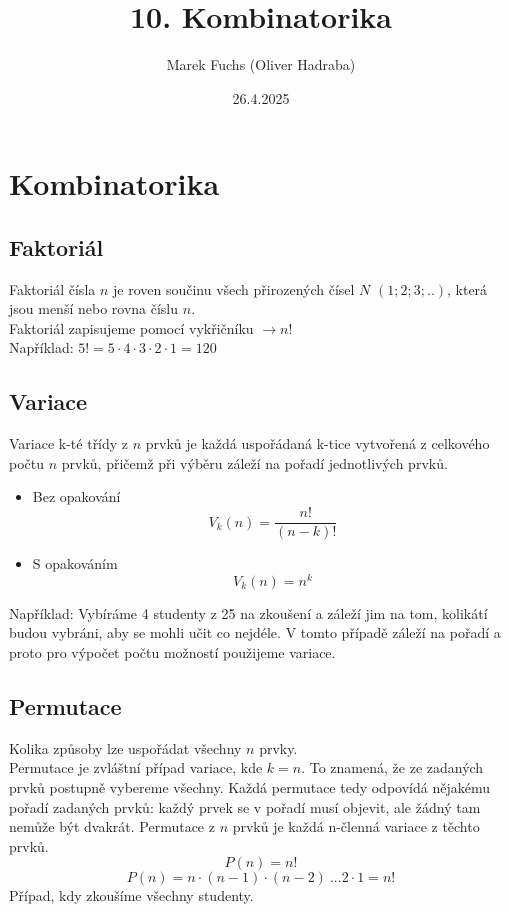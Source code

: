 \title{ 10. Kombinatorika}
\author{Marek Fuchs (Oliver Hadraba)}
\date{26.4.2025}

\maketitle



\section{Kombinatorika}
    
     \subsection{Faktoriál}
     Faktoriál čísla $n$ je roven součinu všech přirozených čísel $N$ $(1;2;3;..)$, která jsou menší nebo rovna číslu $n$.\\
     Faktoriál zapisujeme pomocí vykřičníku $\rightarrow{n!}$\\
    Například: $5! = 5\cdot4\cdot3\cdot2\cdot1=120$
     
     \subsection{Variace}
     Variace k-té třídy z $n$ prvků je každá uspořádaná k-tice vytvořená z celkového počtu $n$ prvků, přičemž při výběru záleží na pořadí jednotlivých prvků.
     \begin{itemize}
         \item Bez opakování
         $$
         V_k (n)=\frac{n!}{(n-k)!}
         $$
         \item S opakováním
         $$
         V_k (n)=n^k
         $$
     \end{itemize}
Například: Vybíráme 4 studenty z 25 na zkoušení a záleží jim na tom, kolikátí budou vybráni, aby se mohli učit co nejdéle. V tomto případě záleží na pořadí a proto pro výpočet počtu možností použijeme variace. 

     \subsection{Permutace}
     Kolika způsoby lze uspořádat všechny $n$ prvky.\\
     Permutace je zvláštní případ variace, kde $k=n$. To znamená, že ze zadaných prvků postupně vybereme všechny. Každá permutace tedy odpovídá nějakému pořadí zadaných prvků: každý prvek se v pořadí musí objevit, ale žádný tam nemůže být dvakrát. Permutace z $n$ prvků je každá n-členná variace z těchto prvků.
     $$
     P(n)=n!
     $$
     $$
     P(n)=n \cdot(n-1)\cdot(n-2) \ ...2\cdot1=n!
     $$
     Případ, kdy zkoušíme všechny studenty.
